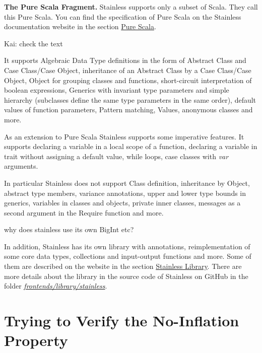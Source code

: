 \documentclass[runningheads]{llncs}
\renewcommand{\paragraph}{\textbf}%
\newcommand{\todo}[1]{{\par \color{red}#1}}
\begin{document}
\paragraph{The Pure Scala Fragment.} Stainless supports only a subset
of Scala. They call this Pure Scala.  You can find the specification of Pure
Scala on the Stainless documentation website
\cite{Stainless:documentation} in the section
\href{https://epfl-lara.github.io/stainless/purescala.html}{Pure
  Scala}.
\todo{Kai: check the text

It supports Algebraic Data Type definitions in the form of 
Abstract Class and Case Class/Case Object,
inheritance of an Abstract Class by a Case Class/Case Object,
Object for grouping classes and functions,  
short-circuit interpretation of boolean expressions, 
Generics with invariant type parameters and simple hierarchy 
(subclasses define the same type parameters in the same order),
default values of function parameters,
Pattern matching, 
Values,
anonymous classes and more.
  
As an extension to Pure Scala Stainless supports some imperative features.
It supports 
declaring a variable in a local scope of a function, 
declaring a variable in trait without assigning a default value,
while loops,
case classes with \textit{var} arguments.
  
In particular Stainless does not support
Class definition,
inheritance by Object,
abstract type members,
variance annotations, upper and lower type bounds in generics,
variables in classes and objects,
private inner classes,
messages as a second argument in the Require function and more.}

\todo{why does stainless use its own BigInt etc?}

In addition, Stainless has its own library with annotations,
reimplementation of some core data types, collections and input-output
functions and more.  Some of them are described on the website in the
section
\href{https://epfl-lara.github.io/stainless/library.html}{Stainless
  Library}.  There are more details about the library in the source
code of Stainless on GitHub \cite{Stainless:github} in the folder
\href{https://github.com/epfl-lara/stainless/tree/master/frontends/library/stainless}{\textit{frontends/library/stainless}}.





\section{Trying to Verify the No-Inflation Property}
\end{document}
